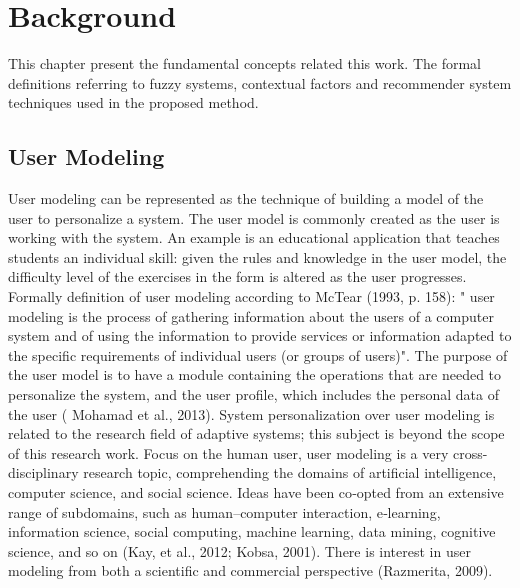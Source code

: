 

\chapter{Background}

This chapter present the fundamental concepts related this work. The
formal definitions referring to fuzzy systems, contextual factors and
recommender system techniques used in the proposed method.

\section{User Modeling}


User modeling can be represented as the technique of building a model of the
user to personalize a system. The user model is commonly created as the user is
working with the system. An example is an educational application that teaches
students an individual skill: given the rules and knowledge in the user model,
the difficulty level of the exercises in the form is altered as the user
progresses.   Formally definition of user modeling according to McTear (1993, p.
158): " user modeling is the process of gathering information about the users of
a computer system and of using the information to provide services or
information adapted to the specific requirements of individual users (or groups
of users)". The purpose of the user model is to have a module containing the
operations that are needed to personalize the system, and the user profile,
which includes the personal data of the user ( Mohamad et al., 2013).    System
personalization over user modeling is related to the research field of adaptive
systems; this subject is beyond the scope of this research work. Focus on the
human user, user modeling is a very cross-disciplinary research topic,
comprehending the domains of artificial intelligence, computer science, and
social science. Ideas have been co‐opted from an extensive range of subdomains,
such as human–computer interaction, e‐learning, information science, social
computing, machine learning, data mining, cognitive science, and so on (Kay, et
al., 2012; Kobsa, 2001). There is interest in user modeling from both a
scientific and commercial perspective (Razmerita, 2009).


